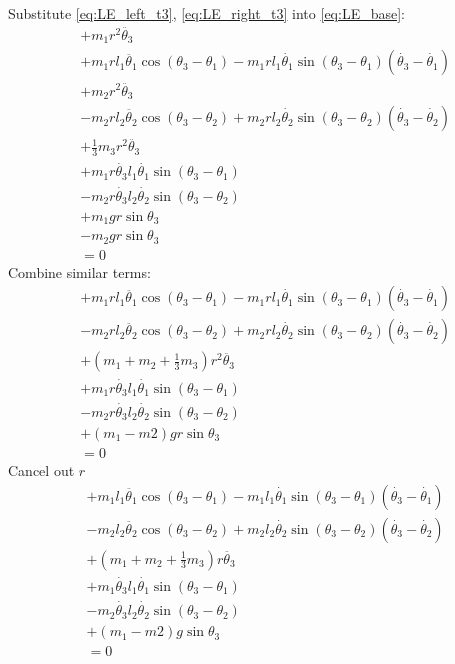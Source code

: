\documentclass[titlepage]{article}
\numberwithin{equation}{section}
\begin{document}
Substitute \ref{eq:LE_left_t3}, \ref{eq:LE_right_t3} into \ref{eq:LE_base}:
\begin{align}
 &+ m_1 r^2 \ddot{\theta_3} \nonumber \\
 &+ m_1 r l_1 \ddot{\theta_1} \cos{(\theta_3 - \theta_1)} - m_1 r l_1 \dot{\theta_1} \sin{(\theta_3 - \theta_1)} (\dot{\theta_3} - \dot{\theta_1}) \nonumber \\
 &+ m_2 r^2 \ddot{\theta_3} \nonumber \\
 &- m_2 r l_2 \ddot{\theta_2} \cos{(\theta_3 - \theta_2)} + m_2 r l_2 \dot{\theta_2} \sin{(\theta_3 - \theta_2)} (\dot{\theta_3} - \dot{\theta_2}) \nonumber \\
 &+ \frac{1}{3} m_3 r^2 \ddot{\theta_3} \nonumber \\
 &+ m_1 r \dot{\theta_3} l_1 \dot{\theta_1} \sin{(\theta_3 - \theta_1)} \nonumber \\
 &- m_2 r \dot{\theta_3} l_2 \dot{\theta_2} \sin{(\theta_3 - \theta_2)} \nonumber \\
 &+ m_1 g r \sin \theta_3 \nonumber \\
 &- m_2 g r \sin \theta_3 \nonumber \\
 &= 0
\end{align}
Combine similar terms:
\begin{align}
 &+ m_1 r l_1 \ddot{\theta_1} \cos{(\theta_3 - \theta_1)} - m_1 r l_1 \dot{\theta_1} \sin{(\theta_3 - \theta_1)} (\dot{\theta_3} - \dot{\theta_1}) \nonumber \\
 &- m_2 r l_2 \ddot{\theta_2} \cos{(\theta_3 - \theta_2)} + m_2 r l_2 \dot{\theta_2} \sin{(\theta_3 - \theta_2)} (\dot{\theta_3} - \dot{\theta_2}) \nonumber \\
 &+ (m_1 + m_2 + \frac{1}{3} m_3) r^2 \ddot{\theta_3} \nonumber \\
 &+ m_1 r \dot{\theta_3} l_1 \dot{\theta_1} \sin{(\theta_3 - \theta_1)} \nonumber \\
 &- m_2 r \dot{\theta_3} l_2 \dot{\theta_2} \sin{(\theta_3 - \theta_2)} \nonumber \\
 &+ (m_1 - m2) g r \sin \theta_3 \nonumber \\
 &= 0
\end{align}
Cancel out $r$
\begin{align}
 &+ m_1 l_1 \ddot{\theta_1} \cos{(\theta_3 - \theta_1)} - m_1 l_1 \dot{\theta_1} \sin{(\theta_3 - \theta_1)} (\dot{\theta_3} - \dot{\theta_1}) \nonumber \\
 &- m_2 l_2 \ddot{\theta_2} \cos{(\theta_3 - \theta_2)} + m_2 l_2 \dot{\theta_2} \sin{(\theta_3 - \theta_2)} (\dot{\theta_3} - \dot{\theta_2}) \nonumber \\
 &+ (m_1 + m_2 + \frac{1}{3} m_3) r \ddot{\theta_3} \nonumber \\
 &+ m_1 \dot{\theta_3} l_1 \dot{\theta_1} \sin{(\theta_3 - \theta_1)} \nonumber \\
 &- m_2 \dot{\theta_3} l_2 \dot{\theta_2} \sin{(\theta_3 - \theta_2)} \nonumber \\
 &+ (m_1 - m2) g \sin \theta_3 \nonumber \\
 &= 0
\end{align}
\end{document}
